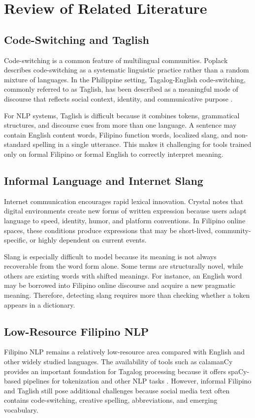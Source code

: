 \section{Review of Related Literature}

\subsection{Code-Switching and Taglish}
Code-switching is a common feature of multilingual communities. Poplack \cite{b2} describes code-switching as a systematic linguistic practice rather than a random mixture of languages. In the Philippine setting, Tagalog-English code-switching, commonly referred to as Taglish, has been described as a meaningful mode of discourse that reflects social context, identity, and communicative purpose \cite{b1,b3}.

For NLP systems, Taglish is difficult because it combines tokens, grammatical structures, and discourse cues from more than one language. A sentence may contain English content words, Filipino function words, localized slang, and non-standard spelling in a single utterance. This makes it challenging for tools trained only on formal Filipino or formal English to correctly interpret meaning.

\subsection{Informal Language and Internet Slang}
Internet communication encourages rapid lexical innovation. Crystal \cite{b4} notes that digital environments create new forms of written expression because users adapt language to speed, identity, humor, and platform conventions. In Filipino online spaces, these conditions produce expressions that may be short-lived, community-specific, or highly dependent on current events.

Slang is especially difficult to model because its meaning is not always recoverable from the word form alone. Some terms are structurally novel, while others are existing words with shifted meanings. For instance, an English word may be borrowed into Filipino online discourse and acquire a new pragmatic meaning. Therefore, detecting slang requires more than checking whether a token appears in a dictionary.

\subsection{Low-Resource Filipino NLP}
Filipino NLP remains a relatively low-resource area compared with English and other widely studied languages. The availability of tools such as calamanCy provides an important foundation for Tagalog processing because it offers spaCy-based pipelines for tokenization and other NLP tasks \cite{b6}. However, informal Filipino and Taglish still pose additional challenges because social media text often contains code-switching, creative spelling, abbreviations, and emerging vocabulary.

